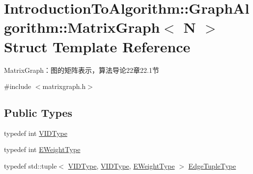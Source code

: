\hypertarget{struct_introduction_to_algorithm_1_1_graph_algorithm_1_1_matrix_graph}{}\section{Introduction\+To\+Algorithm\+:\+:Graph\+Algorithm\+:\+:Matrix\+Graph$<$ N $>$ Struct Template Reference}
\label{struct_introduction_to_algorithm_1_1_graph_algorithm_1_1_matrix_graph}


Matrix\+Graph：图的矩阵表示，算法导论22章22.1节  




{\ttfamily \#include $<$matrixgraph.\+h$>$}

\subsection*{Public Types}
\begin{DoxyCompactItemize}
\item 
typedef int \hyperlink{struct_introduction_to_algorithm_1_1_graph_algorithm_1_1_matrix_graph_ae97378c88e8d65a880334f31a352e71d}{V\+I\+D\+Type}
\item 
typedef int \hyperlink{struct_introduction_to_algorithm_1_1_graph_algorithm_1_1_matrix_graph_af54dbf6d171b89b81b490de13f1fb02f}{E\+Weight\+Type}
\item 
typedef std\+::tuple$<$ \hyperlink{struct_introduction_to_algorithm_1_1_graph_algorithm_1_1_matrix_graph_ae97378c88e8d65a880334f31a352e71d}{V\+I\+D\+Type}, \hyperlink{struct_introduction_to_algorithm_1_1_graph_algorithm_1_1_matrix_graph_ae97378c88e8d65a880334f31a352e71d}{V\+I\+D\+Type}, \hyperlink{struct_introduction_to_algorithm_1_1_graph_algorithm_1_1_matrix_graph_af54dbf6d171b89b81b490de13f1fb02f}{E\+Weight\+Type} $>$ \hyperlink{struct_introduction_to_algorithm_1_1_graph_algorithm_1_1_matrix_graph_ad698e07bacdb3f332c4f5d34bdb49463}{Edge\+Tuple\+Type}
\end{DoxyCompactItemize}
